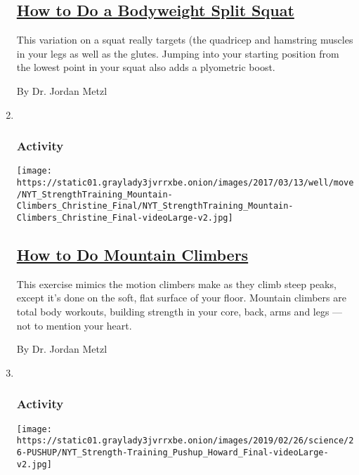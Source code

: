 \begin{enumerate}
  \hypertarget{how-to-do-a-bodyweight-split-squat}{%
  \subsection{\texorpdfstring{\href{/interactive/2017/well/move/how-to-do-bodyweight-split-squat.html}{How
  to Do a Bodyweight Split
  Squat}}{How to Do a Bodyweight Split Squat}}\label{how-to-do-a-bodyweight-split-squat}}

  This variation on a squat really targets (the quadricep and hamstring
  muscles in your legs as well as the glutes. Jumping into your starting
  position from the lowest point in your squat also adds a plyometric
  boost.

  By Dr. Jordan Metzl
\item ~
  \hypertarget{activity-2}{%
  \subsubsection{Activity}\label{activity-2}}

  \texttt{[image: https://static01.graylady3jvrrxbe.onion/images/2017/03/13/well/move/NYT\_StrengthTraining\_Mountain-Climbers\_Christine\_Final/NYT\_StrengthTraining\_Mountain-Climbers\_Christine\_Final-videoLarge-v2.jpg]}

  \hypertarget{how-to-do-mountain-climbers}{%
  \subsection{\texorpdfstring{\href{/interactive/2017/well/move/how-to-do-mountain-climbers.html}{How
  to Do Mountain
  Climbers}}{How to Do Mountain Climbers}}\label{how-to-do-mountain-climbers}}

  This exercise mimics the motion climbers make as they climb steep
  peaks, except it's done on the soft, flat surface of your floor.
  Mountain climbers are total body workouts, building strength in your
  core, back, arms and legs --- not to mention your heart.

  By Dr. Jordan Metzl
\item ~
  \hypertarget{activity-3}{%
  \subsubsection{Activity}\label{activity-3}}

  \texttt{[image: https://static01.graylady3jvrrxbe.onion/images/2019/02/26/science/26-PUSHUP/NYT\_Strength-Training\_Pushup\_Howard\_Final-videoLarge-v2.jpg]}


\end{enumerate}
